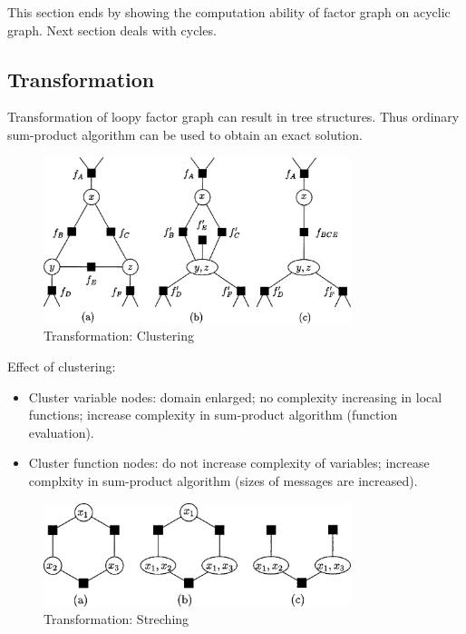 \documentclass[11pt,a4paper]{article}
\begin{document}
This section ends by showing the computation ability of factor graph
on acyclic graph. Next section deals with cycles. 


\subsection{Transformation}

Transformation of loopy factor graph can result in 
tree structures. Thus ordinary sum-product algorithm 
can be used to obtain an exact solution. 

\begin{figure}[htb]
\centering
	\includegraphics[width=0.8\textwidth]{fig/kschischang2001-clutering.png}
	\caption{Transformation: Clustering\cite{kschischang2001factor}}
\end{figure}	

Effect of clustering:
\begin{itemize}
	\item Cluster variable nodes: domain enlarged; no complexity increasing
	in local functions; increase complexity in sum-product algorithm
	(function evaluation). 
	\item Cluster function nodes: do not increase complexity of variables;
	increase complxity in sum-product algorithm
	(sizes of messages are increased). 
\end{itemize}

\begin{figure}[htb]
\centering
	\includegraphics[width=0.8\textwidth]{fig/kschischang2001-streching.png}
	\caption{Transformation: Streching\cite{kschischang2001factor}}
\end{figure}
\end{document}

